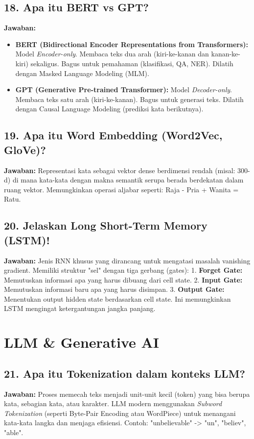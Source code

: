 \subsection{18. Apa itu BERT vs GPT?}
\textbf{Jawaban:}
\begin{itemize}
    \item \textbf{BERT (Bidirectional Encoder Representations from Transformers):} Model \textit{Encoder-only}. Membaca teks dua arah (kiri-ke-kanan dan kanan-ke-kiri) sekaligus. Bagus untuk pemahaman (klasifikasi, QA, NER). Dilatih dengan Masked Language Modeling (MLM).
    \item \textbf{GPT (Generative Pre-trained Transformer):} Model \textit{Decoder-only}. Membaca teks satu arah (kiri-ke-kanan). Bagus untuk generasi teks. Dilatih dengan Causal Language Modeling (prediksi kata berikutnya).
\end{itemize}

\subsection{19. Apa itu Word Embedding (Word2Vec, GloVe)?}
\textbf{Jawaban:}
Representasi kata sebagai vektor dense berdimensi rendah (misal: 300-d) di mana kata-kata dengan makna semantik serupa berada berdekatan dalam ruang vektor. Memungkinkan operasi aljabar seperti: Raja - Pria + Wanita = Ratu.

\subsection{20. Jelaskan Long Short-Term Memory (LSTM)!}
\textbf{Jawaban:}
Jenis RNN khusus yang dirancang untuk mengatasi masalah vanishing gradient. Memiliki struktur "sel" dengan tiga gerbang (gates):
1. \textbf{Forget Gate:} Memutuskan informasi apa yang harus dibuang dari cell state.
2. \textbf{Input Gate:} Memutuskan informasi baru apa yang harus disimpan.
3. \textbf{Output Gate:} Menentukan output hidden state berdasarkan cell state.
Ini memungkinkan LSTM mengingat ketergantungan jangka panjang.

\section{LLM & Generative AI}

\subsection{21. Apa itu Tokenization dalam konteks LLM?}
\textbf{Jawaban:}
Proses memecah teks menjadi unit-unit kecil (token) yang bisa berupa kata, sebagian kata, atau karakter. LLM modern menggunakan \textit{Subword Tokenization} (seperti Byte-Pair Encoding atau WordPiece) untuk menangani kata-kata langka dan menjaga efisiensi. Contoh: "unbelievable" -> "un", "believ", "able".

